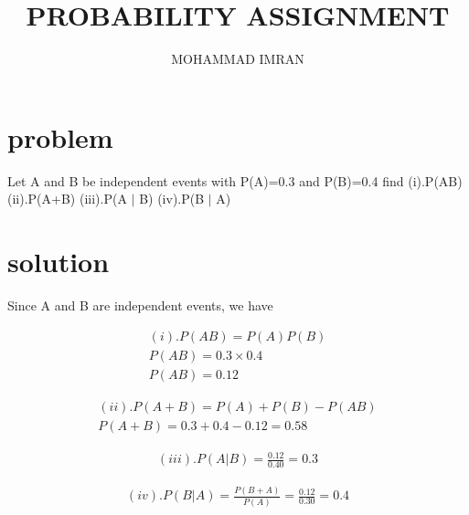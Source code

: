 \documentclass[journal,12pt,twocolumn]{article}
\title{PROBABILITY ASSIGNMENT}
\author{MOHAMMAD IMRAN}
\begin{document}
\maketitle
\bigskip

\section{problem }

Let A and B be independent events with P(A)=0.3 and P(B)=0.4 find 
(i).P(AB)
     (ii).P(A+B) 
(iii).P(A $\mid$ B)   
       (iv).P(B $\mid$ A)
\section{solution }  


Since A and B are independent events, we have 

\begin{align}
(i).P(AB)=P(A) P(B)\\
P(AB)=0.3 \times 0.4\\
P(AB)=0.12\label{1}
\end{align}

\begin{align}
(ii). P(A+B)=P(A)+P(B)-P(AB)\\
P(A+B)=0.3+0.4-0.12=0.58\label{2}
\end{align}

\begin{align}
(iii).P(A | B)=\frac{0.12}{0.40}=0.3\label{3}
\end{align}

\begin{align}
(iv).P(B | A)=\frac{P(B+A)}{P(A)}=\frac{0.12}{0.30}=0.4
\end{align}
 
\end{document}
